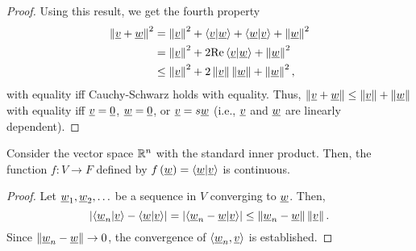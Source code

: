 \begin{proof}
Using this result, we get the fourth property
\begin{equation*}
\begin{split}
\left\| \underline{v} + \underline{w} \right\|^2
&= \left\| \underline{v} \right\|^2 + \left\langle \underline{v} | \underline{w} \right\rangle + \left\langle \underline{w} | \underline{v} \right\rangle + \left\| \underline{w} \right\|^2 \\
&= \left\| \underline{v} \right\|^2 + 2 \mathrm{Re} \left\langle \underline{v} | \underline{w} \right\rangle + \left\| \underline{w} \right\|^2 \\
&\leq \left\| \underline{v} \right\|^2 + 2 \left\| \underline{v} \right\| \left\| \underline{w} \right\| + \left\| \underline{w} \right\|^2 ,
\end{split}
\end{equation*}
with equality iff Cauchy-Schwarz holds with equality.
Thus, $\left\| \underline{v} + \underline{w} \right\| \leq \left\| \underline{v} \right\| + \left\| \underline{w} \right\|$ with equality iff $\underline{v} = \underline{0}$, $\underline{w}=\underline{0}$, or $\underline{v} = s \underline{w}$ (i.e., $\underline{v}$ and $\underline{w}$ are linearly dependent).
\end{proof}


\begin{theorem}
\label{theorem:InnerProductContinuous}
Consider the vector space $\mathbb{R}^n$ with the standard inner product. %
Then, the function $f \colon V \rightarrow F$ defined by $f \left( \underline{w} \right) = \left\langle \underline{w} | \underline{v} \right\rangle$ is continuous.
\end{theorem}
\begin{proof}
Let $\underline{w}_1, \underline{w}_2, \ldots$ be a sequence in $V$ converging to $\underline{w}$.
Then,
\begin{equation*}
\left| \left\langle \underline{w}_n | \underline{v} \right\rangle
- \left\langle \underline{w} | \underline{v} \right\rangle \right|
= \left| \left\langle \underline{w}_n - \underline{w} | \underline{v} \right\rangle \right|
\leq \left\| \underline{w}_n - \underline{w} \right\| \left\| \underline{v} \right\|.
\end{equation*}
Since $\left\| \underline{w}_n - \underline{w} \right\| \rightarrow 0$, the convergence of $\left\langle \underline{w}_n, \underline{v} \right\rangle$ is established.
\end{proof}


